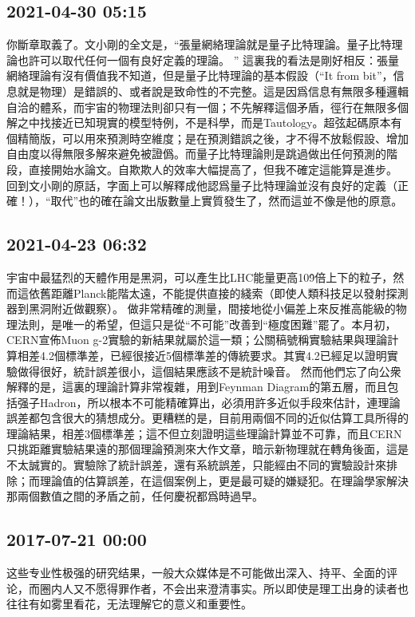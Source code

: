 \documentclass[twocolumn]{ctexart}
\begin{document}
\subsection*{2021-04-30 05:15}

你斷章取義了。文小剛的全文是，“張量網絡理論就是量子比特理論。量子比特理論也許可以取代任何一個有良好定義的理論。 ”
這裏我的看法是剛好相反：張量網絡理論有沒有價值我不知道，但是量子比特理論的基本假設（“It from bit”，信息就是物理）是錯誤的、或者說是致命性的不完整。這是因爲信息有無限多種邏輯自洽的體系，而宇宙的物理法則卻只有一個；不先解釋這個矛盾，徑行在無限多個解之中找接近已知現實的模型特例，不是科學，而是Tautology。超弦起碼原本有個精簡版，可以用來預測時空維度；是在預測錯誤之後，才不得不放鬆假設、增加自由度以得無限多解來避免被證僞。而量子比特理論則是跳過做出任何預測的階段，直接開始水論文。自欺欺人的效率大幅提高了，但我不確定這能算是進步。
回到文小剛的原話，字面上可以解釋成他認爲量子比特理論並沒有良好的定義（正確！），“取代”也的確在論文出版數量上實質發生了，然而這並不像是他的原意。
\subsection*{2021-04-23 06:32}

宇宙中最猛烈的天體作用是黑洞，可以產生比LHC能量更高10\^9倍上下的粒子，然而這依舊距離Planck能階太遠，不能提供直接的綫索（即使人類科技足以發射探測器到黑洞附近做觀察）。
做非常精確的測量，間接地從小偏差上來反推高能級的物理法則，是唯一的希望，但這只是從“不可能”改善到“極度困難”罷了。本月初，CERN宣佈Muon g-2實驗的新結果就屬於這一類；公關稿號稱實驗結果與理論計算相差4.2個標準差，已經很接近5個標準差的傳統要求。其實4.2已經足以證明實驗做得很好，統計誤差很小，這個結果應該不是統計噪音。
然而他們忘了向公衆解釋的是，這裏的理論計算非常複雜，用到Feynman Diagram的第五層，而且包括强子Hadron，所以根本不可能精確算出，必須用許多近似手段來估計，連理論誤差都包含很大的猜想成分。更糟糕的是，目前用兩個不同的近似估算工具所得的理論結果，相差3個標準差；這不但立刻證明這些理論計算並不可靠，而且CERN只挑距離實驗結果遠的那個理論預測來大作文章，暗示新物理就在轉角後面，這是不太誠實的。實驗除了統計誤差，還有系統誤差，只能經由不同的實驗設計來排除；而理論值的估算誤差，在這個案例上，更是最可疑的嫌疑犯。在理論學家解決那兩個數值之間的矛盾之前，任何慶祝都爲時過早。
\subsection*{2017-07-21 00:00}
这些专业性极强的研究结果，一般大众媒体是不可能做出深入、持平、全面的评论，而圈内人又不愿得罪作者，不会出来澄清事实。所以即使是理工出身的读者也往往有如雾里看花，无法理解它的意义和重要性。
\end{document}
